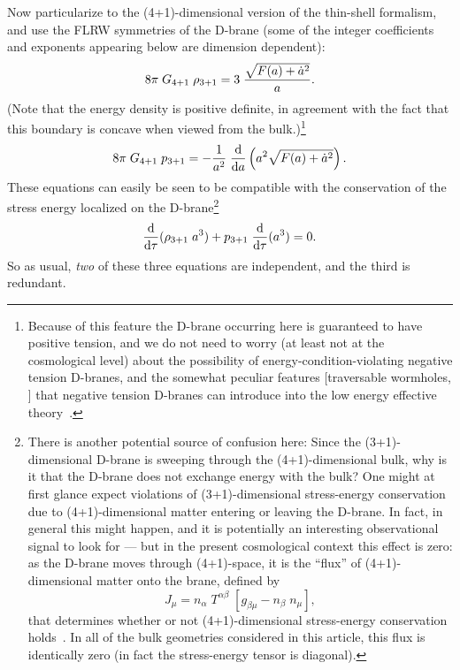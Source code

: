 \documentclass[a4paper,12pt]{article}
\begin{document}
Now particularize to the (4+1)-dimensional version of the thin-shell
formalism, and use the FLRW symmetries of the D-brane (some of the
integer coefficients and exponents appearing below are dimension
dependent):
%
\begin{equation}
8\pi \; G_{4+1} \; \rho_{3+1} 
=  3  \; {\sqrt{F(a)+\dot a^2}\over a}.
\end{equation}
%
(Note that the energy density is positive definite, in agreement with
the fact that this boundary is concave when viewed from the
bulk.)\footnote{
Because of this feature the D-brane occurring here is guaranteed to
have positive tension, and we do not need to worry (at least not at
the cosmological level) about the possibility of
energy-condition-violating negative tension D-branes, and the somewhat
peculiar features [traversable wormholes, \etc] that negative tension
D-branes can introduce into the low energy effective
theory~\cite{Brane-surgery}.}
%
\begin{equation}
8\pi \; G_{4+1} \; p_{3+1}
=   - {1\over a^2}  
\; {{\mathrm d}\over{\mathrm d} a} \left(a^2 \sqrt{F(a)+\dot a^2} \right).
\end{equation}
%
These equations can easily be seen to be compatible with the
conservation of the stress energy localized on the D-brane\footnote{
There is another potential source of confusion here: Since the
(3+1)-dimensional D-brane is sweeping through the (4+1)-dimensional
bulk, why is it that the D-brane does not exchange energy with the
bulk?  One might at first glance expect violations of
(3+1)-dimensional stress-energy conservation due to (4+1)-dimensional
matter entering or leaving the D-brane. In fact, in general this might
happen, and it is potentially an interesting observational signal to
look for --- but in the present cosmological context this effect is
zero: as the D-brane moves through (4+1)-space, it is the ``flux'' of
(4+1)-dimensional matter onto the brane, defined by
%
\[
J_\mu = 
n_\alpha \; T^{\alpha\beta} \; \left[ g_{\beta \mu} - n_\beta \; n_\mu  \right],
\]
% 
that determines whether or not (4+1)-dimensional stress-energy
conservation holds~\cite{Book}. In all of the bulk geometries
considered in this article, this flux is identically zero (in fact the
stress-energy tensor is diagonal).}
%
\begin{equation}
{{\mathrm d}\over{\mathrm d}\tau} (\rho_{3+1} \; a^3) + p_{3+1} \; {{\mathrm d}\over{\mathrm d}\tau} (a^3) = 0.
\end{equation}
%
So as usual, {\em two} of these three equations are independent, 
and the third is redundant.
\end{document}
